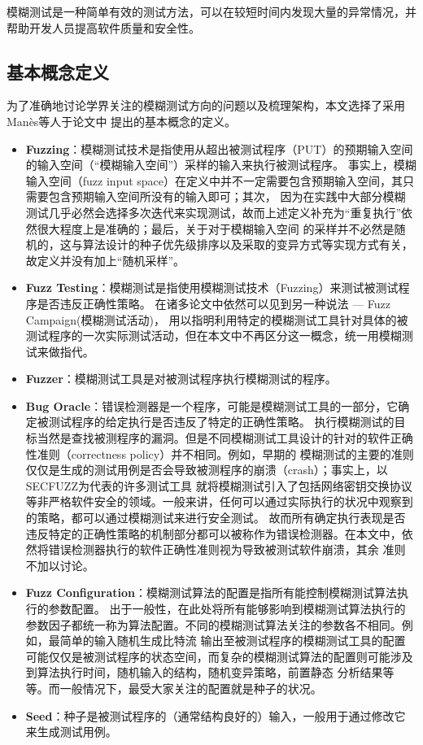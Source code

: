 \documentclass[bachelor]{njupthesis}
\begin{document}
模糊测试是一种简单有效的测试方法，可以在较短时间内发现大量的异常情况，并帮助开发人员提高软件质量和安全性。

\subsection{基本概念定义}
为了准确地讨论学界关注的模糊测试方向的问题以及梳理架构，本文选择了采用Man{\`e}s等人于论文\cite{manes2019art}中
提出的基本概念的定义。

\begin{itemize}[leftmargin=36pt]
	\item \textbf{Fuzzing}：模糊测试技术是指使用从超出被测试程序（PUT）的预期输入空间的输入空间（“模糊输入空间”）采样的输入来执行被测试程序。
	事实上，模糊输入空间（fuzz input space）在定义中并不一定需要包含预期输入空间，其只需要包含预期输入空间所没有的输入即可；其次，
	 因为在实践中大部分模糊测试几乎必然会选择多次迭代来实现测试，故而上述定义补充为“重复执行”依然很大程度上是准确的；最后，关于对于模糊输入空间
	 的采样并不必然是随机的，这与算法设计的种子优先级排序以及采取的变异方式等实现方式有关，故定义并没有加上“随机采样”。
	\item \textbf{Fuzz Testing}：模糊测试是指使用模糊测试技术（Fuzzing）来测试被测试程序是否违反正确性策略。
	在诸多论文\cite{householder2012probability,rebert2014optimizing,bohme2020fuzzing}中依然可以见到另一种说法 --- Fuzz Campaign(模糊测试活动)，
	用以指明利用特定的模糊测试工具针对具体的被测试程序的一次实际测试活动，但在本文中不再区分这一概念，统一用模糊测试来做指代。
	\item \textbf{Fuzzer}：模糊测试工具是对被测试程序执行模糊测试的程序。
	\item \textbf{Bug Oracle}：错误检测器是一个程序，可能是模糊测试工具的一部分，它确定被测试程序的给定执行是否违反了特定的正确性策略。
	执行模糊测试的目标当然是查找被测程序的漏洞。但是不同模糊测试工具设计的针对的软件正确性准则（correctness policy）并不相同。例如，早期的
	模糊测试的主要的准则仅仅是生成的测试用例是否会导致被测程序的崩溃（crash）；事实上，以SECFUZZ\cite{tsankov2012secfuzz}为代表的许多测试工具
	就将模糊测试引入了包括网络密钥交换协议等非严格软件安全的领域。一般来讲，任何可以通过实际执行的状况中观察到的策略，都可以通过模糊测试来进行安全测试。
	故而所有确定执行表现是否违反特定的正确性策略的机制部分都可以被称作为错误检测器。在本文中，依然将错误检测器执行的软件正确性准则视为导致被测试软件崩溃，其余
	准则不加以讨论。
	\item \textbf{Fuzz Configuration}：模糊测试算法的配置是指所有能控制模糊测试算法执行的参数配置。
	出于一般性，在此处将所有能够影响到模糊测试算法执行的参数因子都统一称为算法配置。不同的模糊测试算法关注的参数各不相同。例如，最简单的输入随机生成比特流
	输出至被测试程序的模糊测试工具的配置可能仅仅是被测试程序的状态空间，而复杂的模糊测试算法的配置则可能涉及到算法执行时间，随机输入的结构，随机变异策略，前置静态
	分析结果等等。而一般情况下，最受大家关注的配置就是种子的状况。
	\item \textbf{Seed}：种子是被测试程序的（通常结构良好的）输入，一般用于通过修改它来生成测试用例。
\end{itemize}
\end{document}
